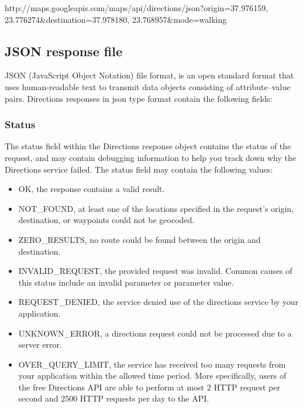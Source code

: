 \begin{center}
 http://maps.googleapis.com/maps/api/directions/json?origin=37.976159, 23.776274\&destination=37.978180, 23.768957\&mode=walking
\end{center}

\subsection{JSON response file}

JSON (JavaScript Object Notation) file format, is an open standard format that uses human-readable text to transmit data objects consisting of attribute–value pairs. 
Directions responses in json type format contain the following fields: 

\subsubsection{Status}

The status field within the Directions response object contains the status of the request, and may contain debugging information to help you track down why 
the Directions service failed. The status field may contain the following values:

\begin{itemize}
 \item OK, the response contains a valid result. 
 \item NOT\_FOUND, at least one of the locations specified in the request's origin, destination, or waypoints could not be geocoded.
 \item ZERO\_RESULTS, no route could be found between the origin and destination.
 \item INVALID\_REQUEST, the provided request was invalid. Common causes of this status include an invalid parameter or parameter value.
 \item REQUEST\_DENIED, the service denied use of the directions service by your application. 
 \item UNKNOWN\_ERROR, a directions request could not be processed due to a server error. 
 \item OVER\_QUERY\_LIMIT, the service has received too many requests from your application within the allowed time period. 
 More specifically, users of the free Directions API are able to perform at most 2 HTTP request per second and 2500 HTTP requests per day to the API.

\end{itemize}

